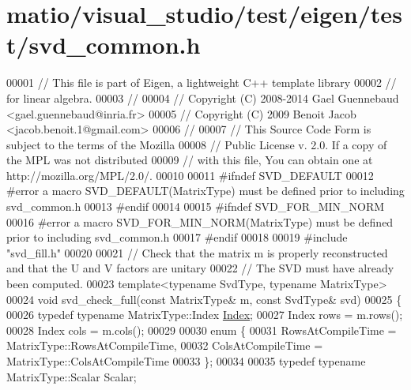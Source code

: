 \hypertarget{matio_2visual__studio_2test_2eigen_2test_2svd__common_8h_source}{}\section{matio/visual\+\_\+studio/test/eigen/test/svd\+\_\+common.h}
\label{matio_2visual__studio_2test_2eigen_2test_2svd__common_8h_source}

\begin{DoxyCode}
00001 \textcolor{comment}{// This file is part of Eigen, a lightweight C++ template library}
00002 \textcolor{comment}{// for linear algebra.}
00003 \textcolor{comment}{//}
00004 \textcolor{comment}{// Copyright (C) 2008-2014 Gael Guennebaud <gael.guennebaud@inria.fr>}
00005 \textcolor{comment}{// Copyright (C) 2009 Benoit Jacob <jacob.benoit.1@gmail.com>}
00006 \textcolor{comment}{//}
00007 \textcolor{comment}{// This Source Code Form is subject to the terms of the Mozilla}
00008 \textcolor{comment}{// Public License v. 2.0. If a copy of the MPL was not distributed}
00009 \textcolor{comment}{// with this file, You can obtain one at http://mozilla.org/MPL/2.0/.}
00010 
00011 \textcolor{preprocessor}{#ifndef SVD\_DEFAULT}
00012 \textcolor{preprocessor}{#error a macro SVD\_DEFAULT(MatrixType) must be defined prior to including svd\_common.h}
00013 \textcolor{preprocessor}{#endif}
00014 
00015 \textcolor{preprocessor}{#ifndef SVD\_FOR\_MIN\_NORM}
00016 \textcolor{preprocessor}{#error a macro SVD\_FOR\_MIN\_NORM(MatrixType) must be defined prior to including svd\_common.h}
00017 \textcolor{preprocessor}{#endif}
00018 
00019 \textcolor{preprocessor}{#include "svd\_fill.h"}
00020 
00021 \textcolor{comment}{// Check that the matrix m is properly reconstructed and that the U and V factors are unitary}
00022 \textcolor{comment}{// The SVD must have already been computed.}
00023 \textcolor{keyword}{template}<\textcolor{keyword}{typename} SvdType, \textcolor{keyword}{typename} MatrixType>
00024 \textcolor{keywordtype}{void} svd\_check\_full(\textcolor{keyword}{const} MatrixType& m, \textcolor{keyword}{const} SvdType& svd)
00025 \{
00026   \textcolor{keyword}{typedef} \textcolor{keyword}{typename} MatrixType::Index \hyperlink{namespace_eigen_a62e77e0933482dafde8fe197d9a2cfde}{Index};
00027   Index rows = m.rows();
00028   Index cols = m.cols();
00029 
00030   \textcolor{keyword}{enum} \{
00031     RowsAtCompileTime = MatrixType::RowsAtCompileTime,
00032     ColsAtCompileTime = MatrixType::ColsAtCompileTime
00033   \};
00034 
00035   \textcolor{keyword}{typedef} \textcolor{keyword}{typename} MatrixType::Scalar Scalar;

\end{DoxyCode}
